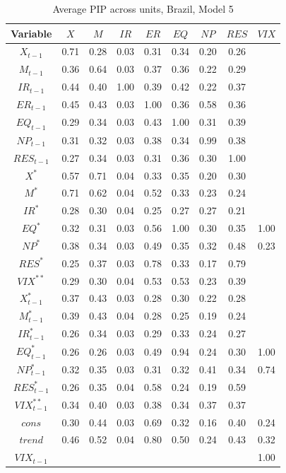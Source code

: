 \documentclass[a4paper, twoside]{templates/ociamthesis}
\begin{document}
\begin{table}[!ht]

\caption{\label{tab:Table55BR5}Average PIP across units, Brazil, Model 5}
\centering
\fontsize{8}{10}\selectfont
\begin{tabular}[t]{ccccccccc}
\toprule
Variable & $X$ & $M$ & $IR$ & $ER$ & $EQ$ & $NP$ & $RES$ & $VIX$\\
\midrule
$X_{t-1}$ & 0.71 & 0.28 & 0.03 & 0.31 & 0.34 & 0.20 & 0.26 & \\
$M_{t-1}$ & 0.36 & 0.64 & 0.03 & 0.37 & 0.36 & 0.22 & 0.29 & \\
$IR_{t-1}$ & 0.44 & 0.40 & 1.00 & 0.39 & 0.42 & 0.22 & 0.37 & \\
$ER_{t-1}$ & 0.45 & 0.43 & 0.03 & 1.00 & 0.36 & 0.58 & 0.36 & \\
$EQ_{t-1}$ & 0.29 & 0.34 & 0.03 & 0.43 & 1.00 & 0.31 & 0.39 & \\
$NP_{t-1}$ & 0.31 & 0.32 & 0.03 & 0.38 & 0.34 & 0.99 & 0.38 & \\
$RES_{t-1}$ & 0.27 & 0.34 & 0.03 & 0.31 & 0.36 & 0.30 & 1.00 & \\
$X^*$ & 0.57 & 0.71 & 0.04 & 0.33 & 0.35 & 0.20 & 0.30 & \\
$M^*$ & 0.71 & 0.62 & 0.04 & 0.52 & 0.33 & 0.23 & 0.24 & \\
$IR^*$ & 0.28 & 0.30 & 0.04 & 0.25 & 0.27 & 0.27 & 0.21 & \\
$EQ^*$ & 0.32 & 0.31 & 0.03 & 0.56 & 1.00 & 0.30 & 0.35 & 1.00\\
$NP^*$ & 0.38 & 0.34 & 0.03 & 0.49 & 0.35 & 0.32 & 0.48 & 0.23\\
$RES^*$ & 0.25 & 0.37 & 0.03 & 0.78 & 0.33 & 0.17 & 0.79 & \\
$VIX^{**}$ & 0.29 & 0.30 & 0.04 & 0.53 & 0.53 & 0.23 & 0.39 & \\
$X^*_{t-1}$ & 0.37 & 0.43 & 0.03 & 0.28 & 0.30 & 0.22 & 0.28 & \\
$M^*_{t-1}$ & 0.39 & 0.43 & 0.04 & 0.28 & 0.25 & 0.19 & 0.24 & \\
$IR^*_{t-1}$ & 0.26 & 0.34 & 0.03 & 0.29 & 0.33 & 0.24 & 0.27 & \\
$EQ^*_{t-1}$ & 0.26 & 0.26 & 0.03 & 0.49 & 0.94 & 0.24 & 0.30 & 1.00\\
$NP^*_{t-1}$ & 0.32 & 0.35 & 0.03 & 0.31 & 0.32 & 0.41 & 0.34 & 0.74\\
$RES^*_{t-1}$ & 0.26 & 0.35 & 0.04 & 0.58 & 0.24 & 0.19 & 0.59 & \\
$VIX^{**}_{t-1}$ & 0.34 & 0.40 & 0.03 & 0.38 & 0.34 & 0.37 & 0.37 & \\
$cons$ & 0.30 & 0.44 & 0.03 & 0.69 & 0.32 & 0.16 & 0.40 & 0.24\\
$trend$ & 0.46 & 0.52 & 0.04 & 0.80 & 0.50 & 0.24 & 0.43 & 0.32\\
$VIX_{t-1}$ &  &  &  &  &  &  &  & 1.00\\
\bottomrule
\end{tabular}
\end{table}
\end{document}
